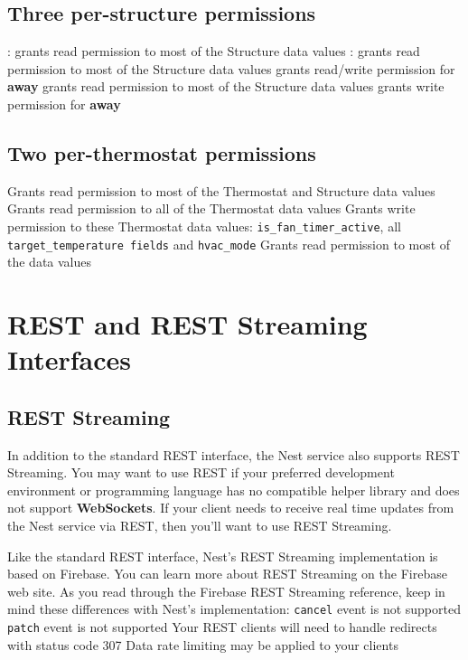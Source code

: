 \documentclass{myproc}
\begin{document}
\subsection{Three per-structure permissions}
\bit
\w {}:
  grants read permission to most of the Structure data values
\w {}:
   \bit  
   \w grants read permission to most of the Structure data values
   \w grants read/write permission for \textcolor{red2}{\bf{}away}
   \eit
\w {}
   \bit
   \w  grants read permission to most of the Structure data values
   \w grants write permission for \textcolor{red2}{\bf{}away}

   \eit
\eit

\subsection{Two per-thermostat permissions}
\bit
\w {}
   \bit
   \w Grants read permission to most of the Thermostat and Structure data
   values
   \eit
\w {}
  \bit
  \w Grants read permission to all of the Thermostat data values
  \w Grants write permission to these Thermostat data values:
        \textcolor{red2}{\texttt{is\_fan\_timer\_active}}, all 
        \textcolor{red2}{\texttt{target\_temperature\ fields}} and 
        \textcolor{red2}{\texttt{hvac\_mode}}
 \w Grants read permission to most of the  data values
  \eit
\eit


\section{REST and REST Streaming Interfaces}
\subsection{REST Streaming}
In addition to the standard REST interface, the Nest service also supports
REST Streaming. You may want to use REST if your preferred development
environment or programming language has no compatible helper library and does
not support \textcolor{blue2}{\bf{}WebSockets}. If your client needs to
  receive real time updates from the Nest service via REST, then you'll want
  to use REST Streaming.  

Like the standard REST interface, Nest's REST Streaming implementation is
based on Firebase. You can learn more about REST Streaming on the Firebase web
site. As you read through the Firebase REST Streaming reference, keep in mind
these differences with Nest's implementation: 
\bit
\w \textcolor{red2}{\texttt{cancel}} event is not supported
\w \textcolor{red2}{\texttt{patch}} event is not supported
\w     Your REST clients will need to handle redirects with status code 307
\w     Data rate limiting may be applied to your clients
\eit
\end{document}
